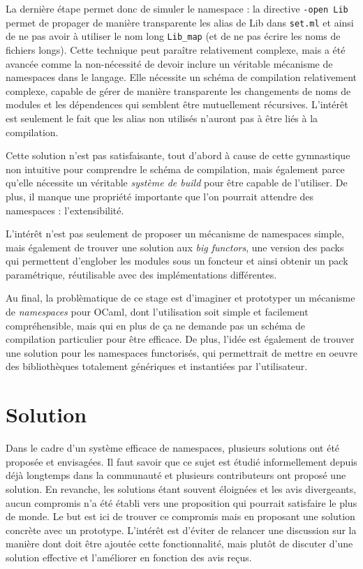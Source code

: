 \documentclass[11pt,a4paper]{report}
\begin{document}
La dernière étape permet donc de simuler le namespace : la directive
\texttt{-open Lib} permet de propager de manière transparente les alias de Lib
dans \texttt{set.ml} et ainsi de ne pas avoir à utiliser le nom long
\texttt{Lib\_map} (et de ne pas écrire les noms de fichiers longs). Cette
technique peut paraître relativement complexe, mais a été avancée comme la
non-nécessité de devoir inclure un véritable mécanisme de namespaces dans le
langage. Elle nécessite un schéma de compilation relativement complexe, capable
de gérer de manière transparente les changements de noms de modules et les
dépendences qui semblent être mutuellement récursives. L'intérêt est seulement
le fait que les alias non utilisés n'auront pas à être liés à la compilation.

Cette solution n'est pas satisfaisante, tout d'abord à cause de cette
gymnastique non intuitive pour comprendre le schéma de compilation, mais
également parce qu'elle nécessite un véritable \emph{système de build} pour être
capable de l'utiliser. De plus, il manque une propriété importante que l'on
pourrait attendre des namespaces : l'extensibilité.

L'intérêt n'est pas seulement de proposer un mécanisme de namespaces simple,
mais également de trouver une solution aux \emph{big functors}, une version des
packs qui permettent d'englober les modules sous un foncteur et ainsi obtenir
un pack paramétrique, réutilisable avec des implémentations
différentes. 

\medskip

Au final, la problèmatique de ce stage est d'imaginer et prototyper un mécanisme
de \emph{namespaces} pour OCaml, dont l'utilisation soit simple et facilement
compréhensible, mais qui en plus de ça ne demande pas un schéma de compilation
particulier pour être efficace. De plus, l'idée est également de trouver une
solution pour les namespaces functorisés, qui permettrait de mettre en oeuvre
des bibliothèques totalement génériques et instantiées par l'utilisateur.


\chapter{Solution}

Dans le cadre d'un système efficace de namespaces, plusieurs solutions ont été
proposée et envisagées. Il faut savoir que ce sujet est étudié informellement
depuis déjà longtemps dans la communauté et plusieurs contributeurs ont proposé
une solution. En revanche, les solutions étant souvent éloignées et les avis
divergeants, aucun compromis n'a été établi vers une proposition qui pourrait
satisfaire le plus de monde. Le but est ici de trouver ce compromis mais en
proposant une solution concrète avec un prototype. L'intérêt est d'éviter de
relancer une discussion sur la manière dont doit être ajoutée cette
fonctionnalité, mais plutôt de discuter d'une solution effective et l'améliorer
en fonction des avis reçus.
\end{document}
